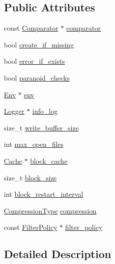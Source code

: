 \subsection*{Public Attributes}
\begin{DoxyCompactItemize}
\item 
const \hyperlink{structleveldb_1_1_comparator}{Comparator} $\ast$ \hyperlink{structleveldb_1_1_options_a7522fbf79de73c4f73ef8d9392e8c80b}{comparator}
\item 
bool \hyperlink{structleveldb_1_1_options_afe1b4e94164ff8f081b1c25bf1bcb62e}{create\+\_\+if\+\_\+missing}
\item 
bool \hyperlink{structleveldb_1_1_options_aff3b99b1b30a2dba9642adc6c912d5b7}{error\+\_\+if\+\_\+exists}
\item 
bool \hyperlink{structleveldb_1_1_options_a4263dcc655493100eecc9daf6737a10b}{paranoid\+\_\+checks}
\item 
\hyperlink{classleveldb_1_1_env}{Env} $\ast$ \hyperlink{structleveldb_1_1_options_aeb08bfe820e9c89f57446d6fbd2e6ea8}{env}
\item 
\hyperlink{classleveldb_1_1_logger}{Logger} $\ast$ \hyperlink{structleveldb_1_1_options_af5545cba00b0e9763ad0279a74acc429}{info\+\_\+log}
\item 
size\+\_\+t \hyperlink{structleveldb_1_1_options_a017f1f9558e6b3887434df29a16dac97}{write\+\_\+buffer\+\_\+size}
\item 
int \hyperlink{structleveldb_1_1_options_a25c6ea125fc63342d8fc25b2f7817be4}{max\+\_\+open\+\_\+files}
\item 
\hyperlink{classleveldb_1_1_cache}{Cache} $\ast$ \hyperlink{structleveldb_1_1_options_a4e87749ebac1ba28dff6bb63eb2059e5}{block\+\_\+cache}
\item 
size\+\_\+t \hyperlink{structleveldb_1_1_options_a715c7941b43db641e76e598aa9ab52a0}{block\+\_\+size}
\item 
int \hyperlink{structleveldb_1_1_options_ac71d66ae44e481edc3922d3a139c30b4}{block\+\_\+restart\+\_\+interval}
\item 
\hyperlink{namespaceleveldb_a047a8e77a76becb82bab4720994f6f9b}{Compression\+Type} \hyperlink{structleveldb_1_1_options_abdaf09c8bb3a788636ffb86cb93b01ab}{compression}
\item 
const \hyperlink{classleveldb_1_1_filter_policy}{Filter\+Policy} $\ast$ \hyperlink{structleveldb_1_1_options_a24c88997a866d535e68de15b5c3cd02b}{filter\+\_\+policy}
\end{DoxyCompactItemize}


\subsection{Detailed Description}


